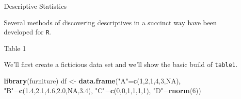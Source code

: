 \documentclass[10pt,ignorenonframetext,]{beamer}
\newenvironment{Shaded}{\begin{snugshade}}{\end{snugshade}}
\newcommand{\KeywordTok}[1]{\textcolor[rgb]{0.13,0.29,0.53}{\textbf{{#1}}}}
\newcommand{\DecValTok}[1]{\textcolor[rgb]{0.00,0.00,0.81}{{#1}}}
\newcommand{\FloatTok}[1]{\textcolor[rgb]{0.00,0.00,0.81}{{#1}}}
\newcommand{\StringTok}[1]{\textcolor[rgb]{0.31,0.60,0.02}{{#1}}}
\newcommand{\OtherTok}[1]{\textcolor[rgb]{0.56,0.35,0.01}{{#1}}}
\newcommand{\NormalTok}[1]{{#1}}
\providecommand{\tightlist}{%
\setlength{\itemsep}{0pt}\setlength{\parskip}{0pt}}
\begin{document}
\begin{frame}[fragile]{Descriptive Statistics}

Several methods of discovering descriptives in a succinct way have been
developed for \texttt{R}.


\end{frame}

\begin{frame}[fragile]{Table 1}

We'll first create a ficticious data set and we'll show the basic build
of \texttt{table1}.

\begin{Shaded}
\begin{Highlighting}[]
\KeywordTok{library}\NormalTok{(furniture)}
\NormalTok{df <-}\StringTok{ }\KeywordTok{data.frame}\NormalTok{(}\StringTok{"A"}\NormalTok{=}\KeywordTok{c}\NormalTok{(}\DecValTok{1}\NormalTok{,}\DecValTok{2}\NormalTok{,}\DecValTok{1}\NormalTok{,}\DecValTok{4}\NormalTok{,}\DecValTok{3}\NormalTok{,}\OtherTok{NA}\NormalTok{),}
                 \StringTok{"B"}\NormalTok{=}\KeywordTok{c}\NormalTok{(}\FloatTok{1.4}\NormalTok{,}\FloatTok{2.1}\NormalTok{,}\FloatTok{4.6}\NormalTok{,}\FloatTok{2.0}\NormalTok{,}\OtherTok{NA}\NormalTok{,}\FloatTok{3.4}\NormalTok{),}
                 \StringTok{"C"}\NormalTok{=}\KeywordTok{c}\NormalTok{(}\DecValTok{0}\NormalTok{,}\DecValTok{0}\NormalTok{,}\DecValTok{1}\NormalTok{,}\DecValTok{1}\NormalTok{,}\DecValTok{1}\NormalTok{,}\DecValTok{1}\NormalTok{),}
                 \StringTok{"D"}\NormalTok{=}\KeywordTok{rnorm}\NormalTok{(}\DecValTok{6}\NormalTok{))}
\end{Highlighting}
\end{Shaded}

\end{frame}
\end{document}
